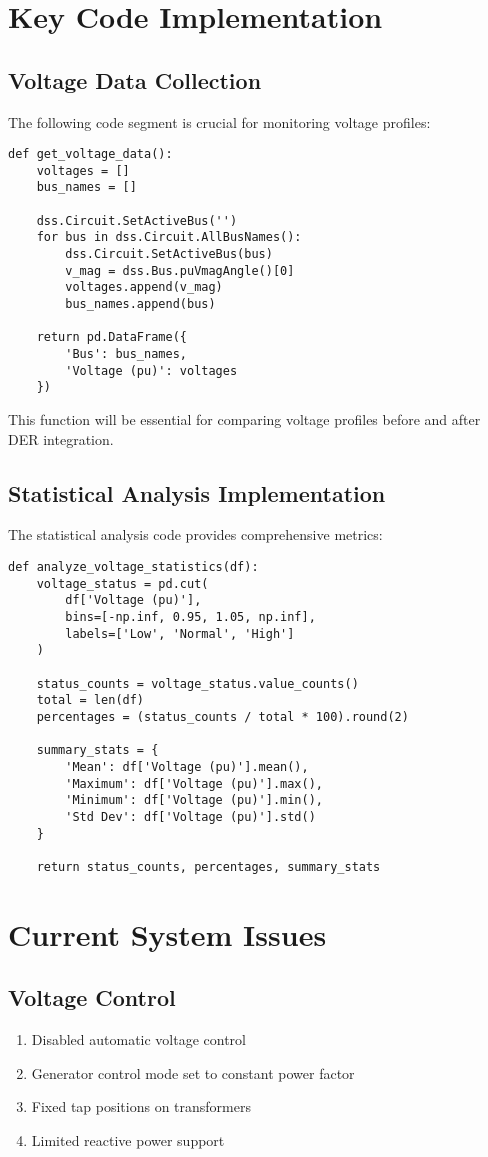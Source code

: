 \documentclass[11pt]{article}
\begin{document}
\section{Key Code Implementation}
\subsection{Voltage Data Collection}
The following code segment is crucial for monitoring voltage profiles:
\begin{lstlisting}
def get_voltage_data():
    voltages = []
    bus_names = []
    
    dss.Circuit.SetActiveBus('')
    for bus in dss.Circuit.AllBusNames():
        dss.Circuit.SetActiveBus(bus)
        v_mag = dss.Bus.puVmagAngle()[0]
        voltages.append(v_mag)
        bus_names.append(bus)
    
    return pd.DataFrame({
        'Bus': bus_names,
        'Voltage (pu)': voltages
    })
\end{lstlisting}
This function will be essential for comparing voltage profiles before and after DER integration.

\subsection{Statistical Analysis Implementation}
The statistical analysis code provides comprehensive metrics:
\begin{lstlisting}
def analyze_voltage_statistics(df):
    voltage_status = pd.cut(
        df['Voltage (pu)'],
        bins=[-np.inf, 0.95, 1.05, np.inf],
        labels=['Low', 'Normal', 'High']
    )
    
    status_counts = voltage_status.value_counts()
    total = len(df)
    percentages = (status_counts / total * 100).round(2)
    
    summary_stats = {
        'Mean': df['Voltage (pu)'].mean(),
        'Maximum': df['Voltage (pu)'].max(),
        'Minimum': df['Voltage (pu)'].min(),
        'Std Dev': df['Voltage (pu)'].std()
    }
    
    return status_counts, percentages, summary_stats
\end{lstlisting}

\section{Current System Issues}
\subsection{Voltage Control}
\begin{enumerate}
    \item Disabled automatic voltage control
    \item Generator control mode set to constant power factor
    \item Fixed tap positions on transformers
    \item Limited reactive power support
\end{enumerate}
\end{document}
